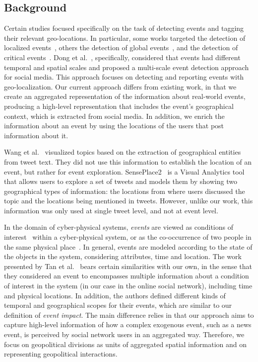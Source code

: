 \subsection{Background}\label{sec:related}

Certain studies focused specifically on the task of detecting events and tagging
their relevant geo-locations. 
%
In particular, some works targeted the detection of localized
events~\cite{Watanabe:Jasmine:2011,Abdelhaq:EvenTweet:2013,Walther:2013fb,Lee:A:2011,Krumm:2015},
others the detection of global events~\cite{sankaranarayanan:twitterstand:2009},
and the detection of critical
events~\cite{Sakaki:Tweet:2013,DeLongueville:2009}.  
%
Dong et al.~\cite{Dong2015}, specifically, considered that events had different
temporal and spatial scales and proposed a multi-scale event detection approach
for social media. 
%
This approach focuses on detecting and reporting events with geo-localization.
%
Our current approach differs from existing work, in that we create an aggregated
representation of the information about real-world events, producing a
high-level representation that includes the event's geographical context, which
is extracted from social media. 
%
In addition, we enrich the information about an event by using the locations of
the users that post information about it.

Wang et al.~\cite{Wang:LeadLine:2012} visualized topics based on the extraction
of geographical entities from tweet text. 
%
They did not use this information to establish the location of an event, but
rather for event exploration. 
%
SensePlace2~\cite{MacEachren:SensePlace2:2011} is a Visual Analytics tool that
allows users to explore a set of tweets and models them by showing two
geographical types of information: the locations from where users discussed the
topic and the locations being mentioned in tweets. 
%
However, unlike our work, this information was only used at single tweet level,
and not at event level.

In the domain of cyber-physical systems, {\em events} are viewed as conditions
of interest~\cite{st-model_2009} within a cyber-physical system, or as the
co-occurrence of two people in the same physical place~\cite{STEvent_2010}.
%
In general, events are modeled according to the state of the objects in the
system, considering attributes, time and location. 
%
The work presented by Tan et al.~\cite{st-model_2009} bears certain similarities
with our own, in the sense that they considered an event to encompasses multiple
information about a condition of interest in the system (in our case in the
online social network), including time and physical locations. 
%
In addition, the authors defined different kinds of temporal and geographical
scopes for their events, which are similar to our definition of {\em event
impact}. 
%
The main difference relies in that our approach aims to capture high-level
information of how a complex exogenous event, such as a news event, is perceived
by social network users in an aggregated way. 
%
Therefore, we focus on geopolitical divisions as units of aggregated spatial
information and on representing geopolitical interactions.

